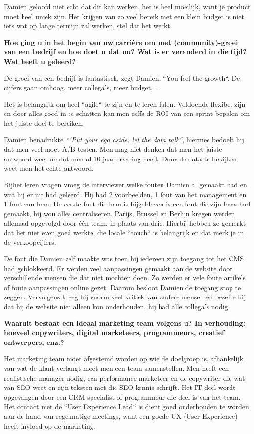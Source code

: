 Damien geloofd niet echt dat dit kan werken, het is heel moeilijk, want je product moet heel uniek zijn. Het krijgen van zo veel bereik met een klein budget is niet iets wat op lange termijn zal werken, stel dat het werkt. 
	
\textbf{Hoe ging u in het begin van uw carrière om met (community)-groei van een bedrijf en hoe doet u dat nu? Wat is er veranderd in die tijd? Wat heeft u geleerd?}

De groei van een bedrijf is fantastisch, zegt Damien, ``You feel the growth``. De cijfers gaan omhoog, meer collega's, meer budget, ...

Het is belangrijk om heel ``agile`` te zijn en te leren falen. Voldoende flexibel zijn en door alles goed in te schatten kan men zelfs de ROI van een sprint bepalen om het juiste doel te bereiken. 

Damien benadrukte \emph{```Put your ego aside, let the data talk``}, hiermee bedoelt hij dat men veel moet A/B testen. Men mag niet denken dat men het juiste antwoord weet omdat men al 10 jaar ervaring heeft. Door de data te bekijken weet men het echte antwoord.
	
Bijhet leren vragen vroeg de interviewer welke fouten Damien al gemaakt had en wat hij er uit had geleerd. Hij had 2 voorbeelden, 1 fout van het management en 1 fout van hem. De eerste fout die hem is bijgebleven is een fout die zijn baas had gemaakt, hij wou alles centraliseren. Parijs, Brussel en Berlijn kregen werden allemaal opgevolgd door één team, in plaats van drie. Hierbij hebben ze gemerkt dat het niet even goed werkte, die locale ``touch`` is belangrijk en dat merk je in de verkoopcijfers. 

De fout die Damien zelf maakte was toen hij iedereen zijn toegang tot het CMS had geblokkeerd. Er werden veel aanpassingen gemaakt aan de website door verschillende mensen die dat niet mochten doen. Zo werden er vele foute artikels of foute aanpassingen online gezet. Daarom besloot Damien de toegang stop te zeggen. Vervolgens kreeg hij enorm veel kritiek van andere mensen en besefte hij dat hij de website niet alleen kon onderhouden, hij had alle collega's nodig.

\textbf{Waaruit bestaat een ideaal marketing team volgens u? In verhouding: hoeveel copywriters, digital marketeers, programmeurs, creatief ontwerpers, enz.?}
	
Het marketing team moet afgestemd worden op wie de doelgroep is, afhankelijk van wat de klant verlangt moet men een team samenstellen. Men heeft een realistische manager nodig, een performance marketeer en de copywriter die wat van SEO weet en zijn teksten met die SEO kennis schrijft. Het IT-deel wordt opgevangen door een CRM specialist of programmeur die deel is van het team. Het contact met de ``User Experience Lead`` is dient goed onderhouden te worden aan de hand van regelmatige meetings, want een goede UX (User Experience) heeft invloed op de marketing.
	
